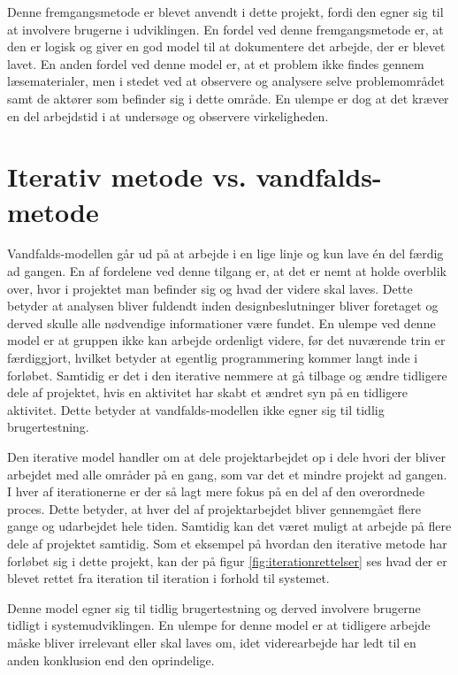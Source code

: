 Denne fremgangsmetode er blevet anvendt i dette projekt, fordi den egner sig til at involvere brugerne i udviklingen. En fordel ved denne fremgangsmetode er, at den er logisk og giver en god model til at dokumentere det arbejde, der er blevet lavet. En anden fordel ved denne model er, at et problem ikke findes gennem læsematerialer, men i stedet ved at observere og analysere selve problemområdet samt de aktører som befinder sig i dette område. En ulempe er dog at det kræver en del arbejdstid i at undersøge og observere virkeligheden.

\section{Iterativ metode vs. vandfalds-metode}
Vandfalds-modellen går ud på at arbejde i en lige linje og kun lave én del færdig ad gangen. En af fordelene ved denne tilgang er, at det er nemt at holde overblik over, hvor i projektet man befinder sig og hvad der videre skal laves. Dette betyder at analysen bliver fuldendt inden designbeslutninger bliver foretaget og derved skulle alle nødvendige informationer være fundet. En ulempe ved denne model er at gruppen ikke kan arbejde ordenligt videre, før det nuværende trin er færdiggjort, hvilket betyder at egentlig programmering kommer langt inde i forløbet. Samtidig er det i den iterative nemmere at gå tilbage og ændre tidligere dele af projektet, hvis en aktivitet har skabt et ændret syn på en tidligere aktivitet. Dette betyder at vandfalds-modellen ikke egner sig til tidlig brugertestning.

Den iterative model handler om at dele projektarbejdet op i dele hvori der bliver arbejdet med alle områder på en gang, som var det et mindre projekt ad gangen. I hver af iterationerne er der så lagt mere fokus på en del af den overordnede proces.
Dette betyder, at hver del af projektarbejdet bliver gennemgået flere gange og udarbejdet hele tiden. Samtidig kan det været muligt at arbejde på flere dele af projektet samtidig. Som et eksempel på hvordan den iterative metode har forløbet sig i dette projekt, kan der på figur \ref{fig:iterationrettelser} ses hvad der er blevet rettet fra iteration til iteration i forhold til systemet.


Denne model egner sig til tidlig brugertestning og derved involvere brugerne tidligt i systemudviklingen. En ulempe for denne model er at tidligere arbejde måske bliver irrelevant eller skal laves om, idet viderearbejde har ledt til en anden konklusion end den oprindelige.

